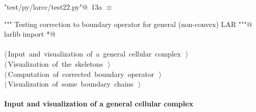 \documentclass[11pt,oneside]{article}	%
\begin{document}
\begin{flushleft} \small \label{scrap22}
\protect{}\verb@"test/py/larcc/test22.py"@\nobreak\ {\footnotesize 13a }$\equiv$
\vspace{-1ex}
\begin{list}{}{} \item
\mbox{}\verb@""" Testing correction to boundary operator for general (non-convex) LAR """@\\
\mbox{}\verb@from larlib import *@\\
\mbox{}\verb@@\\
\mbox{}\verb@@\hbox{$\langle\,$Input and visualization of a general cellular complex\nobreak\ {\footnotesize {}}$\,\rangle$}\verb@@\\
\mbox{}\verb@@\hbox{$\langle\,$Visualization of the skeletons\nobreak\ {\footnotesize {}}$\,\rangle$}\verb@@\\
\mbox{}\verb@@\hbox{$\langle\,$Computation of corrected boundary operator\nobreak\ {\footnotesize {}}$\,\rangle$}\verb@@\\
\mbox{}\verb@@\hbox{$\langle\,$Visualization of some boundary chains\nobreak\ {\footnotesize {}}$\,\rangle$}\verb@@\\
\mbox{}\verb@@{\NWsep}
\end{list}
\vspace{-2ex}
\end{flushleft}

\paragraph{Input and visualization of a general cellular complex}
\end{document}
